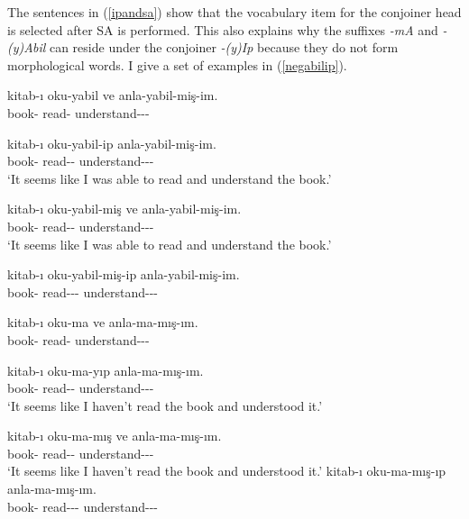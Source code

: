 The sentences in (\ref{ipandsa}) show that the vocabulary item for the conjoiner head is selected after SA is performed. This also explains why the suffixes \textit{-mA} and \textit{-(y)Abil} can reside under the conjoiner \textit{-(y)Ip} because they do not form morphological words. I give a set of examples in (\ref{negabilip}).

\begin{exe}
\ex \label{negabilip}
\begin{xlist}
\ex {\Abil} \begin{xlisti}
\ex \gll *kitab-ı oku-yabil ve anla-yabil-miş-im. \\ 
book-{\Acc} read-{\Abil} {\And} understand-{\Abil}-{\Prf}-{\Fsg} \\
\glt ${}$

\ex \gll kitab-ı oku-yabil-ip anla-yabil-miş-im. \\ 
book-{\Acc} read-{\Abil}-{\Pc} understand-{\Abil}-{\Prf}-{\Fsg} \\
\glt `It seems like I was able to read and understand the book.'
\end{xlisti}

\ex {\Abil-\Prf} \begin{xlisti}
\ex \gll kitab-ı oku-yabil-miş ve anla-yabil-miş-im. \\ 
book-{\Acc} read-{\Abil}-{\Prf} {\And} understand-{\Abil}-{\Prf}-{\Fsg} \\
\glt `It seems like I was able to read and understand the book.'

\ex \gll *kitab-ı oku-yabil-miş-ip anla-yabil-miş-im. \\ 
book-{\Acc} read-{\Abil}-{\Prf}-{\Pc} understand-{\Abil}-{\Prf}-{\Fsg} \\
\glt ${}$
\end{xlisti}

\ex {\Neg} \begin{xlisti}
\ex \gll *kitab-ı oku-ma ve anla-ma-mış-ım. \\ 
book-{\Acc} read-{\Neg} {\And} understand-{\Neg}-{\Prf}-{\Fsg} \\
\glt ${}$

\ex \gll kitab-ı oku-ma-yıp anla-ma-mış-ım. \\ 
book-{\Acc} read-{\Neg}-{\Pc} understand-{\Neg}-{\Prf}-{\Fsg} \\
\glt `It seems like I haven't read the book and understood it.'
\end{xlisti}

\ex {\Neg-\Prf}\begin{xlisti}
\ex \gll kitab-ı oku-ma-mış ve anla-ma-mış-ım. \\ 
book-{\Acc} read-{\Neg}-{\Prf} {\And} understand-{\Neg}-{\Prf}-{\Fsg} \\
\glt `It seems like I haven't read the book and understood it.'
\ex \gll *kitab-ı oku-ma-mış-ıp anla-ma-mış-ım. \\ 
book-{\Acc} read-{\Neg}-{\Prf}-{\Pc} understand-{\Neg}-{\Prf}-{\Fsg} \\

\end{xlisti}
\end{xlist}
\end{exe}

